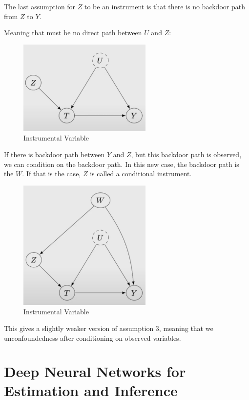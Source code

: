 \documentclass{article}
\begin{document}
The last assumption for $Z$ to be an instrument is that there is no backdoor path from $Z$ to $Y$.

Meaning that must be no direct path between $U$ and $Z$:

\begin{figure}[H]
  \centering
  \includegraphics[width=250px]{draft-photos/instrumental_variable_explanation4.png}
  \caption{Instrumental Variable}
  \label{fig:instrumental_variable_explanation4}
\end{figure}

If there is backdoor path between $Y$ and $Z$, but this backdoor path is observed, we can condition on the backdoor path. In this new case, the backdoor path is the $W$. If that is the case, $Z$ is called a conditional instrument.

\begin{figure}[H]
  \centering
  \includegraphics[width=250px]{draft-photos/instrumental_variable_explanation5.png}
  \caption{Instrumental Variable}
  \label{fig:instrumental_variable_explanation5}
\end{figure}

This gives a slightly weaker version of assumption 3, meaning that we unconfoundedness after conditioning on observed variables.

\section{Deep Neural Networks for Estimation and Inference}
\end{document}
